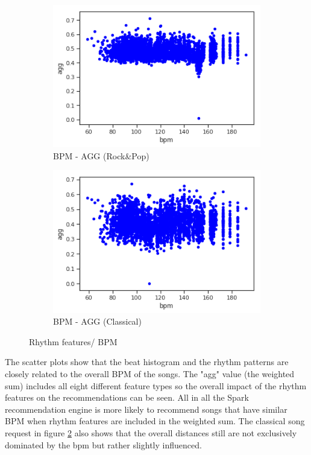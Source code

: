 \begin{figure}[htbp]
{{			\begin{subfigure}{.495\textwidth}
				\centering			
				\includegraphics[scale=0.5]{Images/SparkFeat/bpm_agg_hip.png}	
				\caption{BPM - AGG (Rock\&Pop)}
				\label{fig:arbpm}
			\end{subfigure}		
			\begin{subfigure}{.495\textwidth}
				\centering			
				\includegraphics[scale=0.5]{Images/SparkFeat/bpm_agg_clas.png}	
				\caption{BPM - AGG (Classical)}
				\label{fig:acbpm}
			\end{subfigure}%
	}}
	\caption{Rhythm features/ BPM}
	\label{fig:rhythmfeat}
\end{figure}
\FloatBarrier

\noindent The scatter plots show that the beat histogram and the rhythm patterns are closely related to the overall BPM of the songs. The "agg" value (the weighted sum) includes all eight different feature types so the overall impact of the rhythm features on the recommendations can be seen. All in all the Spark recommendation engine is more likely to recommend songs that have similar BPM when rhythm features are included in the weighted sum. The classical song request in figure \ref{fig:acbpm} also shows that the overall distances still are not exclusively dominated by the bpm but rather slightly influenced. 

